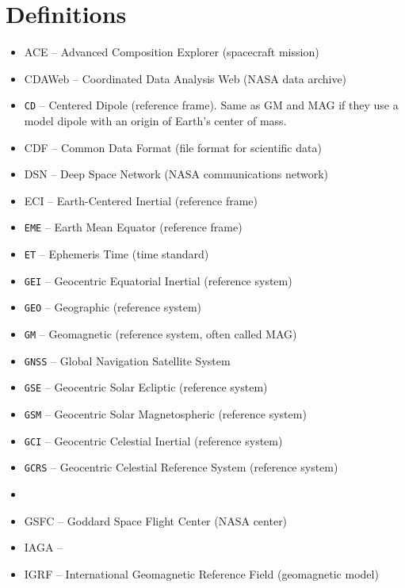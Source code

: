 \documentclass[draft]{agujournal2019}
\begin{document}
\appendix
\section{Definitions}
\label{sect:glossary}

\begin{itemize}
\item ACE -- Advanced Composition Explorer (spacecraft mission)
\item CDAWeb -- Coordinated Data Analysis Web (NASA data archive)
\item \texttt{CD} -- Centered Dipole (reference frame). Same as GM and MAG if they use a model dipole with an origin of Earth's center of mass.
\item CDF -- Common Data Format (file format for scientific data)
\item DSN -- Deep Space Network (NASA communications network)
\item ECI -- Earth-Centered Inertial (reference frame)
\item  \texttt{EME} -- Earth Mean Equator (reference frame)
\item  \texttt{ET} -- Ephemeris Time (time standard)
\item  \texttt{GEI} -- Geocentric Equatorial Inertial (reference system)
\item  \texttt{GEO} -- Geographic (reference system)
\item  \texttt{GM} -- Geomagnetic (reference system, often called MAG)
\item  \texttt{GNSS} -- Global Navigation Satellite System
\item  \texttt{GSE} -- Geocentric Solar Ecliptic (reference system)
\item  \texttt{GSM} -- Geocentric Solar Magnetospheric (reference system)
\item  \texttt{GCI} -- Geocentric Celestial Inertial (reference system)
\item  \texttt{GCRS} -- Geocentric Celestial Reference System (reference system)
\item {}
\item GSFC -- Goddard Space Flight Center (NASA center)
\item IAGA -- 
\item IGRF -- International Geomagnetic Reference Field (geomagnetic model)

\end{itemize}
\end{document}
